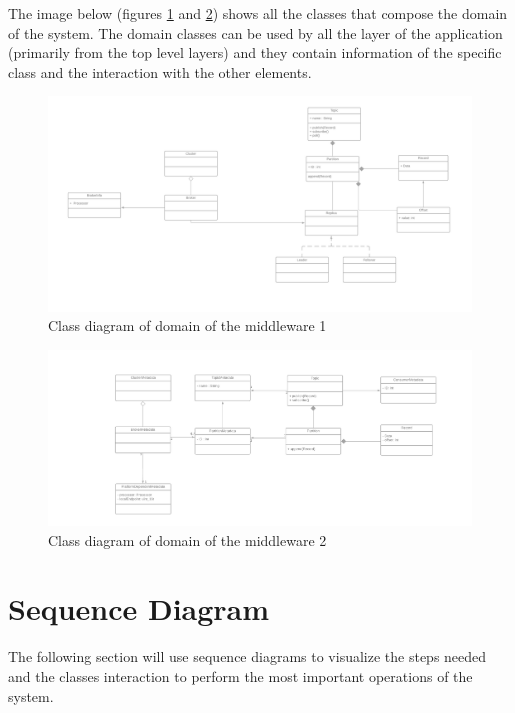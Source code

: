 The image below (figures \ref{fig:class_diagram_domain_1} and \ref{fig:class_diagram_domain_2})
shows all the classes that compose the domain of the system.
The domain classes can be used by all the layer of the application (primarily
from the top level layers) and they contain information of the specific class
and the interaction with the other elements.

\begin{figure}[H]
    \centering
    \includegraphics[width=1.0\textwidth]{Figures/class_diagram_domain_1.png}
    \caption{Class diagram of domain of the middleware 1}
    \label{fig:class_diagram_domain_1}
\end{figure}

\begin{figure}[H]
    \centering
    \includegraphics[width=1.0\textwidth]{Figures/class_diagram_domain_2.png}
    \caption{Class diagram of domain of the middleware 2}
    \label{fig:class_diagram_domain_2}
\end{figure}

\section{Sequence Diagram}

The following section will use sequence diagrams to visualize the steps needed 
and the classes interaction to perform the most important operations of the
system.

